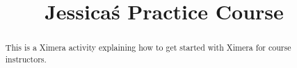 \documentclass{xourse}
\title{Jessica\'s Practice Course}%
\begin{document}
\begin{abstract} %

This is a Ximera activity explaining how to get started with Ximera for course instructors.

\end{abstract}

\maketitle



\end{document}
